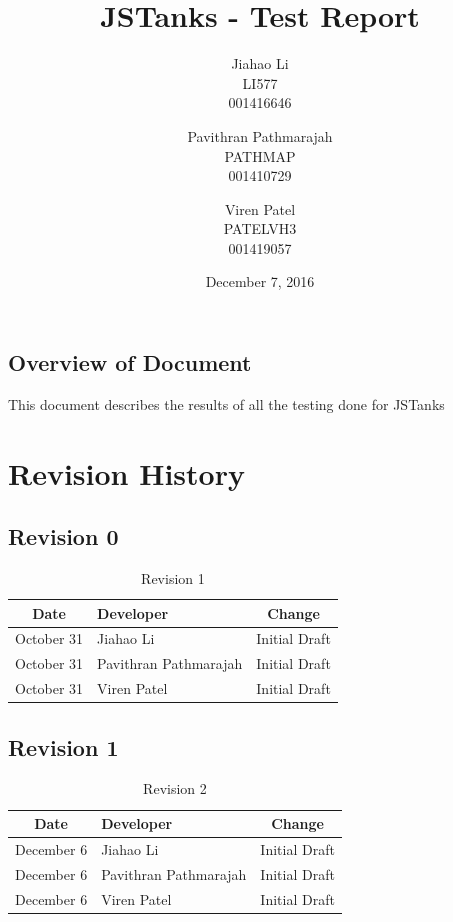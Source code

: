 \documentclass{article}
\begin{document}
\newpage
\title{JSTanks - Test Report}
\date{December 7, 2016}
\author{Jiahao Li\\LI577\\001416646\and Pavithran Pathmarajah\\PATHMAP\\
001410729 \and Viren Patel\\PATELVH3\\001419057}

\maketitle

\newpage
{}
\tableofcontents
\newpage
\listoftables

\newpage
\listoffigures

\newpage


\subsection*{Overview of Document}
This document describes the results of all the testing done for JSTanks

\section{Revision History}
\subsection{Revision 0}
\begin{table}[H]
\caption{Revision 1}
	\begin{tabularx}{\textwidth}{cXc}
		\toprule
		Date & Developer & Change\\
		\midrule
		October 31&Jiahao Li &Initial Draft \\
		October 31&Pavithran Pathmarajah &Initial Draft\\
		October 31&Viren Patel  &Initial Draft\\
	\end{tabularx}
\end{table}

\subsection{Revision 1}
\begin{table}[H]
\caption{Revision 2}
	\begin{tabularx}{\textwidth}{cXc}
		\toprule
		Date & Developer & Change\\
		\midrule
		December 6&Jiahao Li &Initial Draft \\
		December 6&Pavithran Pathmarajah &Initial Draft\\
		December 6&Viren Patel  &Initial Draft\\
	\end{tabularx}
\end{table}
\end{document}
